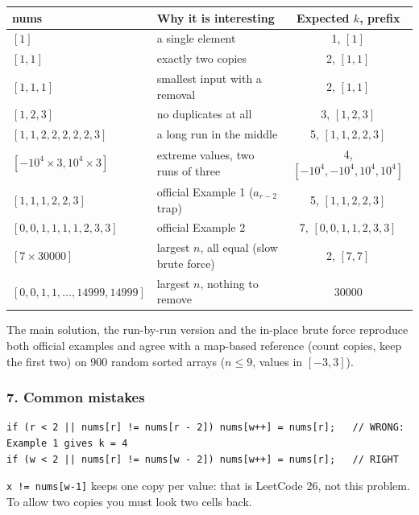 \begin{testbox}
\centering\small
\begin{tabular}{@{}llc@{}}
\toprule
\textbf{nums} & \textbf{Why it is interesting} & \textbf{Expected $k$, prefix} \\
\midrule
$[1]$ & a single element & 1, $[1]$ \\
$[1, 1]$ & exactly two copies & 2, $[1, 1]$ \\
$[1, 1, 1]$ & smallest input with a removal & 2, $[1, 1]$ \\
$[1, 2, 3]$ & no duplicates at all & 3, $[1, 2, 3]$ \\
$[1, 1, 2, 2, 2, 2, 2, 3]$ & a long run in the middle & 5, $[1, 1, 2, 2, 3]$ \\
$[-10^4 \times 3, 10^4 \times 3]$ & extreme values, two runs of three & 4, $[-10^4, -10^4, 10^4, 10^4]$ \\
$[1, 1, 1, 2, 2, 3]$ & official Example 1 ($a_{r-2}$ trap) & 5, $[1, 1, 2, 2, 3]$ \\
$[0, 0, 1, 1, 1, 1, 2, 3, 3]$ & official Example 2 & 7, $[0, 0, 1, 1, 2, 3, 3]$ \\
$[7 \times 30000]$ & largest $n$, all equal (slow brute force) & 2, $[7, 7]$ \\
$[0, 0, 1, 1, \dots, 14999, 14999]$ & largest $n$, nothing to remove & 30000 \\
\bottomrule
\end{tabular}
\end{testbox}
The main solution, the run-by-run version and the in-place brute force reproduce both official examples and agree with a map-based reference (count copies, keep the first two) on 900 random sorted arrays ($n \le 9$, values in $[-3, 3]$).

\subsubsection*{7. Common mistakes}

\begin{warningbox}
\begin{lstlisting}[style=snippet]
if (r < 2 || nums[r] != nums[r - 2]) nums[w++] = nums[r];   // WRONG: Example 1 gives k = 4
if (w < 2 || nums[r] != nums[w - 2]) nums[w++] = nums[r];   // RIGHT
\end{lstlisting}
\end{warningbox}

\begin{warningbox}
\texttt{x != nums[w-1]} keeps one copy per value: that is LeetCode 26, not this problem. To allow two copies you must look two cells back.
\end{warningbox}

